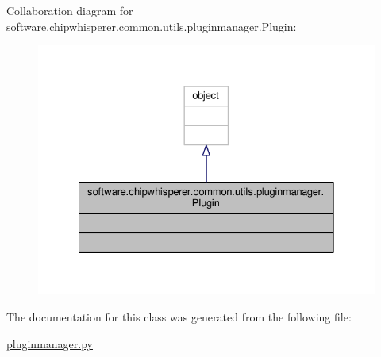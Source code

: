 Collaboration diagram for software.\+chipwhisperer.\+common.\+utils.\+pluginmanager.\+Plugin\+:\nopagebreak
\begin{figure}[H]
\begin{center}
\leavevmode
\includegraphics[width=328pt]{d5/d7e/classsoftware_1_1chipwhisperer_1_1common_1_1utils_1_1pluginmanager_1_1Plugin__coll__graph}
\end{center}
\end{figure}


The documentation for this class was generated from the following file\+:\begin{DoxyCompactItemize}
\item 
\hyperlink{pluginmanager_8py}{pluginmanager.\+py}\end{DoxyCompactItemize}
